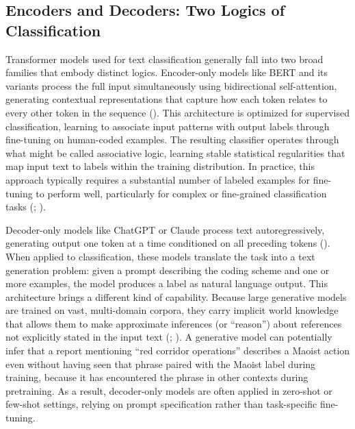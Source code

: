 \documentclass[
  11pt,
]{article}
\begin{document}
\subsection{Encoders and Decoders: Two Logics of
Classification}\label{encoders-and-decoders-two-logics-of-classification}

Transformer models used for text classification generally fall into two
broad families that embody distinct logics. Encoder-only models like
BERT and its variants process the full input simultaneously using
bidirectional self-attention, generating contextual representations that
capture how each token relates to every other token in the sequence
(). This architecture is
optimized for supervised classification, learning to associate input
patterns with output labels through fine-tuning on human-coded examples.
The resulting classifier operates through what might be called
associative logic, learning stable statistical regularities that map
input text to labels within the training distribution. In practice, this
approach typically requires a substantial number of labeled examples for
fine-tuning to perform well, particularly for complex or fine-grained
classification tasks (;
).

Decoder-only models like ChatGPT or Claude process text
autoregressively, generating output one token at a time conditioned on
all preceding tokens (). When
applied to classification, these models translate the task into a text
generation problem: given a prompt describing the coding scheme and one
or more examples, the model produces a label as natural language output.
This architecture brings a different kind of capability. Because large
generative models are trained on vast, multi-domain corpora, they carry
implicit world knowledge that allows them to make approximate inferences
(or ``reason'') about references not explicitly stated in the input text
(;
). A
generative model can potentially infer that a report mentioning ``red
corridor operations'' describes a Maoist action even without having seen
that phrase paired with the Maoist label during training, because it has
encountered the phrase in other contexts during pretraining. As a
result, decoder-only models are often applied in zero-shot or few-shot
settings, relying on prompt specification rather than task-specific
fine-tuning.
\end{document}
